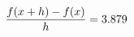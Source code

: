\documentclass[preview]{standalone}
\begin{document}
\begin{align*}
\special{dvisvgm:raw <g id='unique000'>}\frac{f(x+h)-f(x)}{h} = 3.879\special{dvisvgm:raw </g>}
\end{align*}
\end{document}
